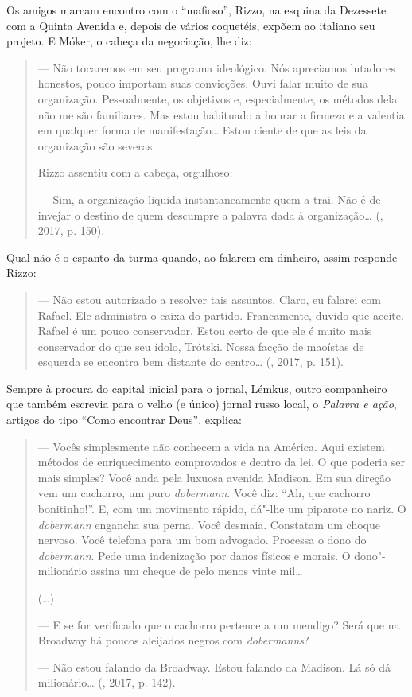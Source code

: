 Os amigos marcam encontro com o ``mafioso'', Rizzo, na esquina da
 Dezessete com a Quinta Avenida e, depois de vários coquetéis, expõem 
ao italiano seu projeto. E Móker, o cabeça da negociação, lhe diz:

\begin{quotation}
--- Não tocaremos em seu programa ideológico. Nós apreciamos lutadores honestos, pouco importam suas convicções. Ouvi falar muito de sua organização. Pessoalmente, os objetivos e, especialmente, os métodos dela não me são familiares. Mas estou habituado a honrar a firmeza e a valentia em qualquer forma de manifestação\ldots{} Estou ciente de que as leis da organização são severas.

Rizzo assentiu com a cabeça, orgulhoso:

--- Sim, a organização liquida instantaneamente quem a trai. Não é de invejar o destino de quem descumpre a palavra dada à organização\ldots{} (, 2017, p. 150).

\end{quotation}

Qual não é o espanto da turma quando, ao falarem em dinheiro, assim responde Rizzo:

\begin{quotation}

--- Não estou autorizado a resolver tais assuntos. Claro, eu falarei com Rafael. Ele administra o caixa do partido. Francamente, duvido que aceite. Rafael é um pouco conservador. Estou certo de que ele é muito mais conservador do que seu ídolo, Trótski. Nossa facção de maoístas de esquerda se encontra bem distante do centro\ldots{} (, 2017, p. 151).

\end{quotation}

Sempre à procura do capital inicial para o jornal, Lémkus, outro
companheiro que também escrevia para o velho (e único) jornal russo
local, o \emph{Palavra e ação}, artigos do tipo ``Como encontrar Deus'',
 explica:

\begin{quotation}
--- Vocês simplesmente não conhecem a vida na América. Aqui existem métodos de enriquecimento comprovados e dentro da lei. O que poderia ser mais simples? Você anda pela luxuosa avenida Madison. Em sua direção vem um cachorro, um puro \emph{dobermann}. Você diz: ``Ah, que cachorro bonitinho!''. E, com um movimento rápido, dá"-lhe um piparote no nariz. O \emph{dobermann} engancha sua perna. Você desmaia. Constatam um choque nervoso. Você telefona para um bom advogado. Processa o dono do \emph{dobermann}. Pede uma indenização por danos físicos e morais. O dono"-milionário assina um cheque de pelo menos vinte mil\ldots{}

(\ldots{})

--- E se for verificado que o cachorro pertence a um mendigo? Será que na Broadway há poucos aleijados negros com \emph{dobermanns}?

--- Não estou falando da Broadway. Estou falando da Madison. Lá só dá milionário\ldots{} (, 2017, p. 142).

\end{quotation}

